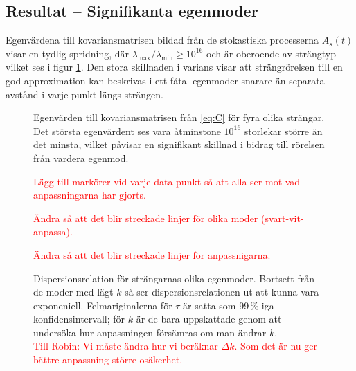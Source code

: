 \subsection{Resultat -- Signifikanta egenmoder}

Egenvärdena till kovariansmatrisen bildad från de stokastiska processerna $A_s(t)$ visar en tydlig spridning, där $\lambda_\text{max}/\lambda_\text{min}\geq 10^{16}$ och är oberoende av strängtyp vilket ses i figur \ref{fig:kovegenvarde}. Den stora skillnaden i varians visar att strängrörelsen till en god approximation kan beskrivas i ett fåtal egenmoder snarare än separata avstånd i varje punkt längs strängen. 



\begin{figure}
    \centering
    
    \caption{Egenvärden till kovariansmatrisen från \eqref{eq:C} för fyra olika strängar. Det största egenvärdent ses vara åtminstone $10^{16}$ storlekar större än det minsta, vilket påvisar en signifikant skillnad i bidrag till rörelsen från vardera egenmod.}
    \label{fig:kovegenvarde}
\end{figure}

\begin{figure}
    \centering
    
    \caption{\textcolor{red}{\Large Lägg till markörer vid varje data punkt så att alla ser mot vad anpassningarna har gjorts.}}
    \label{fig:korrelation}
\end{figure}

\begin{figure}
    \centering
    
    \caption{\textcolor{red}{\Large Ändra så att det blir streckade linjer för olika moder (svart-vit-anpassa).}}
    \label{fig:egenmoder}
\end{figure}

\begin{figure}
    \centering
    
    \caption{\textcolor{red}{\Large Ändra så att det blir streckade linjer för anpassnigarna.}
}
    \label{fig:modkorrektion}
\end{figure}


\begin{figure}\centerline{
\subfigure[][]{

}
\subfigure[][]{

}}
\caption{Dispersionsrelation för strängarnas olika egenmoder. Bortsett från de moder med lägt $k$ så ser dispersionsrelationen ut att kunna vara exponeniell.
Felmariginalerna för $\tau$ är satta som 99\,\%-iga konfidensintervall; för $k$ är de bara uppskattade genom att undersöka hur anpassningen försämras om man ändrar $k$.
\\\textcolor{red}{\Large Till Robin: Vi måste ändra hur vi beräknar $\Delta{k}$. Som det är nu ger bättre anpassning större osäkerhet.}
}
\label{fig:ktau}
\end{figure}

